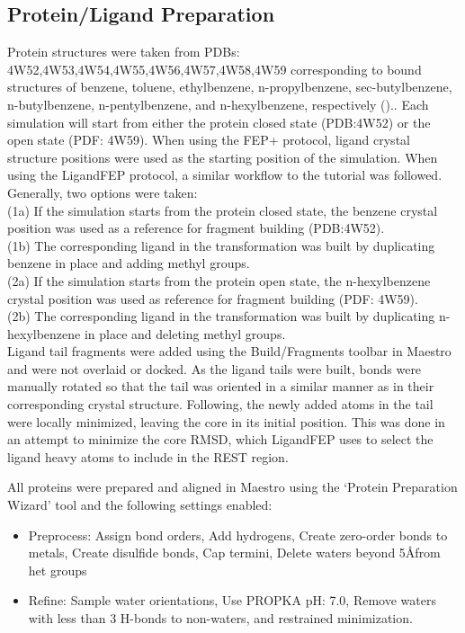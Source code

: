 \documentclass[journal=jctcce,manuscript=article]{achemso}
\begin{document}
\subsection*{Protein/Ligand Preparation}
Protein structures were taken from PDBs: 4W52,4W53,4W54,4W55,4W56,4W57,4W58,4W59 corresponding to bound structures of benzene, toluene, ethylbenzene, n-propylbenzene, sec-butylbenzene, n-butylbenzene, n-pentylbenzene, and n-hexylbenzene, respectively (\cite{Merski2015})..
Each simulation will start from either the protein closed state (PDB:4W52) or the open state (PDF: 4W59).
When using the FEP+ protocol, ligand crystal structure positions were used as the starting position of the simulation.
When using the LigandFEP protocol, a similar workflow to the tutorial \cite{LigandFEP} was followed.
Generally, two options were taken:\\
(1a) If the simulation starts from the protein closed state, the benzene crystal position was used as a reference for fragment building (PDB:4W52).\\
(1b) The corresponding ligand in the transformation was built by duplicating benzene in place and adding methyl groups.\\
(2a) If the simulation starts from the protein open state, the n-hexylbenzene crystal position was used as reference for fragment building (PDF: 4W59).\\
(2b) The corresponding ligand in the transformation was built by duplicating n-hexylbenzene in place and deleting methyl groups.\\
Ligand tail fragments were added using the Build/Fragments toolbar in Maestro \cite{Maestro} and were not overlaid or docked. 
As the ligand tails were built, bonds were manually rotated so that the tail was oriented in a similar manner as in their corresponding crystal structure.
Following, the newly added atoms in the tail were locally minimized, leaving the core in its initial position.
This was done in an attempt to minimize the core RMSD, which LigandFEP uses to select the ligand heavy atoms to include in the REST region. 

All proteins were prepared and aligned in Maestro \cite{Maestro} using the `Protein Preparation Wizard' \cite{ProteinPrepWizSoftware,ProteinPrepWizPaper} tool and the following settings enabled:
   \begin{itemize}
   \item Preprocess: Assign bond orders, Add hydrogens, Create zero-order bonds to metals, Create disulfide bonds, Cap termini, Delete waters beyond 5\AA from het groups
   \item Refine: Sample water orientations, Use PROPKA pH: 7.0, Remove waters with less than 3 H-bonds to non-waters, and restrained minimization.
   \end{itemize}
\end{document}
